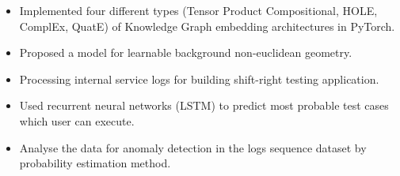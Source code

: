 \documentclass[10pt,a4paper,ragged2e]{altacv}
\begin{document}
\tagline{}

\begin{fullwidth}
\makecvheader
\end{fullwidth}



\begin{itemize}
\item Implemented four different types (Tensor Product Compositional, HOLE, ComplEx, QuatE) of Knowledge Graph embedding architectures in PyTorch.
\item Proposed a model for learnable background non-euclidean geometry. 
\end{itemize}

\divider

\begin{itemize}
\item Processing internal service logs for building shift-right testing application.
\item Used recurrent neural networks (LSTM) to predict most probable test cases which user can execute.
\item Analyse the data for anomaly detection in the logs sequence dataset by probability estimation method.
\end{itemize}
\end{document}
